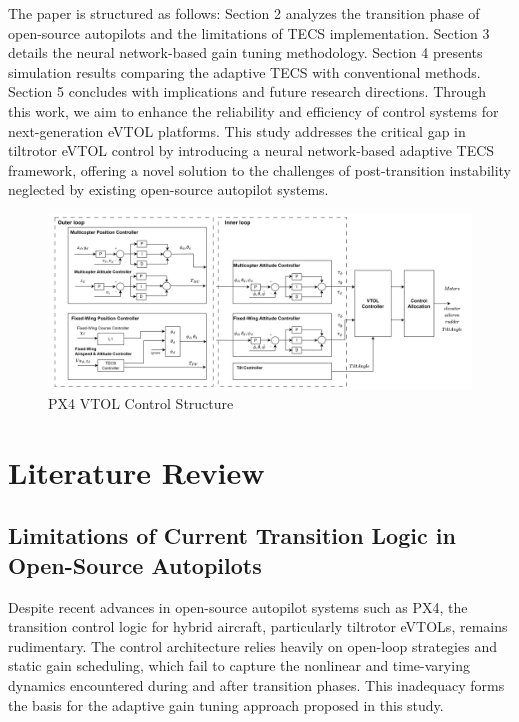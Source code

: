 \documentclass[journal,article,submit,pdftex,moreauthors]{Definitions/mdpi}
\begin{document}
The paper is structured as follows: Section 2 analyzes the transition phase of open-source autopilots and the limitations of TECS implementation. Section 3 details the neural network-based gain tuning methodology. Section 4 presents simulation results comparing the adaptive TECS with conventional methods. Section 5 concludes with implications and future research directions. Through this work, we aim to enhance the reliability and efficiency of control systems for next-generation eVTOL platforms.
This study addresses the critical gap in tiltrotor eVTOL control by introducing a neural network-based adaptive TECS framework, offering a novel solution to the challenges of post-transition instability neglected by existing open-source autopilot systems.
\begin{figure}[H]
    \centering
    \includegraphics[width=1\linewidth]{PX4_VTOL_Control_Structure.png}
    \caption{PX4 VTOL Control Structure}
    \label{fig:enter-label}
\end{figure}
\section{Literature Review}
\subsection{Limitations of Current Transition Logic in Open-Source Autopilots}
Despite recent advances in open-source autopilot systems such as PX4, the transition control logic for hybrid aircraft, particularly tiltrotor eVTOLs, remains rudimentary. The control architecture relies heavily on open-loop strategies and static gain scheduling, which fail to capture the nonlinear and time-varying dynamics encountered during and after transition phases. This inadequacy forms the basis for the adaptive gain tuning approach proposed in this study.
\end{document}
